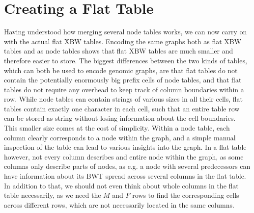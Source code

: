 \documentclass[a4paper,12pt,twoside,BCOR=10mm]{scrbook}
\begin{document}
\section{Creating a Flat Table}
%

Having understood how merging several node tables works, we can now 
carry on with the actual flat XBW tables. 
Encoding the same graphs both as flat XBW tables and as node tables 
shows that flat XBW tables are much smaller and therefore easier to store. 
The biggest differences between the two kinds of tables, 
which can both be used to encode genomic graphs, 
are that flat tables do not contain the potentially enormously big prefix cells 
of node tables, and that flat tables do not require any overhead to 
keep track of column boundaries within a row. 
While node tables can contain strings of various sizes in all their cells, 
flat tables contain exactly one character in each cell, such that 
an entire table row can be stored as string without losing information 
about the cell boundaries. \\
This smaller size comes at the cost of simplicity. 
Within a node table, each column clearly corresponds to a node within the graph, 
and a simple manual inspection of the table can lead to various insights into the graph. 
In a flat table however, not every column describes and entire node within the graph, 
as some columns only describe parts of nodes, as e.g. a node with several predecessors 
can have information about its BWT spread across several columns in the flat table. 
In addition to that, we should not even think about whole columns in the flat table 
necessarily, as we need the $ M $ and $ F $ rows to 
find the corresponding cells across different rows, which are not necessarily located in the same columns.
\end{document}
